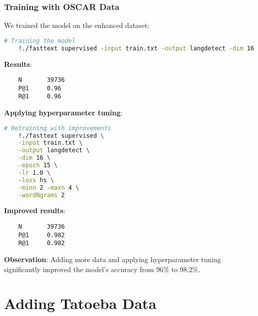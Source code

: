 \documentclass{beamer}
\begin{document}
\begin{frame}[fragile]
    \frametitle{Training with OSCAR Data}
    We trained the model on the enhanced dataset:

    \begin{lstlisting}[language=bash]
    # Training the model
    !./fasttext supervised -input train.txt -output langdetect -dim 16
    \end{lstlisting}

    \textbf{Results}:

    \begin{lstlisting}
    N       39736
    P@1     0.96
    R@1     0.96
    \end{lstlisting}

    \textbf{Applying hyperparameter tuning}:

    \begin{lstlisting}[language=bash]
    # Retraining with improvements
    !./fasttext supervised \
    -input train.txt \
    -output langdetect \
    -dim 16 \
    -epoch 15 \
    -lr 1.0 \
    -loss hs \
    -minn 2 -maxn 4 \
    -wordNgrams 2
    \end{lstlisting}

    \textbf{Improved results}:

    \begin{lstlisting}
    N       39736
    P@1     0.982
    R@1     0.982
    \end{lstlisting}

    \textbf{Observation}: Adding more data and applying hyperparameter tuning significantly improved the model's accuracy from 96\% to 98.2\%.
\end{frame}

\section{Adding Tatoeba Data}
\end{document}
